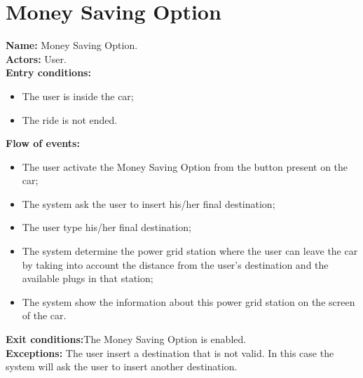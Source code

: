 \section*{Money Saving Option}
\textbf{Name:} Money Saving Option.\\
\textbf{Actors:} User.\\
\textbf{Entry conditions:}
\begin{itemize}
\item The user is inside the car;
\item The ride is not ended.
\end{itemize}
\textbf{Flow of events:}
\begin{itemize}
\item The user activate the Money Saving Option from the button present on the car;
\item The system ask the user to insert his/her final destination;
\item The user type his/her final destination;
\item The system determine the power grid station where the user can leave the car by taking into account the distance from the user's destination and the available plugs in that station;
\item The system show the information about this power grid station on the screen of the car.
\end{itemize}
\textbf{Exit conditions:}The Money Saving Option is enabled.\\
\textbf{Exceptions:} 
The user insert a destination that is not valid. In this case the system will ask the user to insert another destination.

